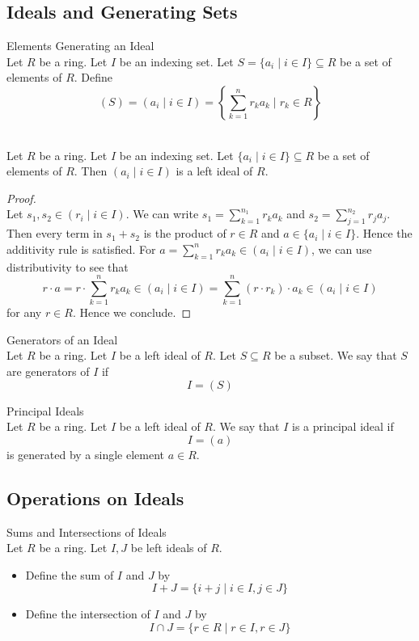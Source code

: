 \documentclass[a4paper]{article}
\begin{document}
\subsection{Ideals and Generating Sets}
\begin{defn}{Elements Generating an Ideal}{}\\
Let $R$ be a ring. Let $I$ be an indexing set. Let $S=\{a_i\;|\;i\in I\}\subseteq R$ be a set of elements of $R$. Define $$(S)=(a_i\;|\;i\in I)=\left\{\sum_{k=1}^nr_ka_k\;|\;r_k\in R\right\}$$
\end{defn}

\begin{lmm}{}{}\\
Let $R$ be a ring. Let $I$ be an indexing set. Let $\{a_i\;|\;i\in I\}\subseteq R$ be a set of elements of $R$. Then $(a_i\;|\;i\in I)$ is a left ideal of $R$. 
\begin{proof}\\
Let $s_1,s_2\in(r_i\;|\;i\in I)$. We can write $s_1=\sum_{k=1}^{n_1}r_ka_k$ and $s_2=\sum_{j=1}^{n_2}r_ja_j$. Then every term in $s_1+s_2$ is the product of $r\in R$ and $a\in\{a_i\;|\;i\in I\}$. Hence the additivity rule is satisfied. For $a=\sum_{k=1}^nr_ka_k\in(a_i\;|\;i\in I)$, we can use distributivity to see that $$r\cdot a=r\cdot\sum_{k=1}^nr_ka_k\in(a_i\;|\;i\in I)=\sum_{k=1}^n(r\cdot r_k)\cdot a_k\in(a_i\;|\;i\in I)$$ for any $r\in R$. Hence we conclude. 
\end{proof}
\end{lmm}

\begin{defn}{Generators of an Ideal}{}\\
Let $R$ be a ring. Let $I$ be a left ideal of $R$. Let $S\subseteq R$ be a subset. We say that $S$ are generators of $I$ if $$I=(S)$$
\end{defn}

\begin{defn}{Principal Ideals}{}\\
Let $R$ be a ring. Let $I$ be a left ideal of $R$. We say that $I$ is a principal ideal if $$I=(a)$$ is generated by a single element $a\in R$. 
\end{defn}

\subsection{Operations on Ideals}
\begin{defn}{Sums and Intersections of Ideals}{}\\
Let $R$ be a ring. Let $I,J$ be left ideals of $R$. 
\begin{itemize}
\item Define the sum of $I$ and $J$ by $$I+J=\{i+j\;|\;i\in I,j\in J\}$$
\item Define the intersection of $I$ and $J$ by $$I\cap J=\{r\in R\;|\;r\in I,r\in J\}$$
\end{itemize}
\end{defn}
\end{document}
